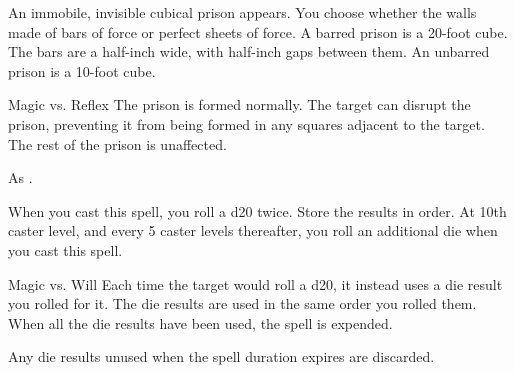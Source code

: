 \begin{spellheader}
    \spellrng{\rngmed}
    \spelldur{\durlong \dismissable}
\end{spellheader}
\begin{spelleffects}
    \spelleffect An immobile, invisible cubical prison appears. You choose whether the walls made of bars of force or perfect sheets of force. A barred prison is a 20-foot cube. The bars are a half-inch wide, with half-inch gaps between them. An unbarred prison is a 10-foot cube.
    \begin{spellattack}{Magic vs. Reflex}
        \spellsuccess The prison is formed normally.
        \spellfailure The target can disrupt the prison, preventing it from being formed in any squares adjacent to the target. The rest of the prison is unaffected.
    \end{spellattack}
\end{spelleffects}
\begin{spellfooter}
    \spellnotes As .
\end{spellfooter}

\begin{spellheader}
    \spellrng{\rngmed}
    \spellspecial When you cast this spell, you roll a d20 twice. Store the results in order. At 10th caster level, and every 5 caster levels thereafter, you roll an additional die when you cast this spell.
\end{spellheader}
\begin{spelleffects}
    \begin{spellattack}{Magic vs. Will}
        \spellsuccess Each time the target would roll a d20, it instead uses a die result you rolled for it. The die results are used in the same order you rolled them. When all the die results have been used, the spell is expended.
    \end{spellattack}
\end{spelleffects}
\begin{spellfooter}
    \spellnotes Any die results unused when the spell duration expires are discarded.
\end{spellfooter}

